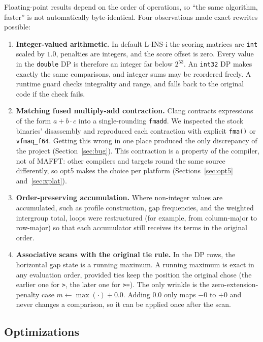 \documentclass[11pt]{article}
\newcommand{\code}[1]{\texttt{#1}}
\begin{document}
Floating-point results depend on the order of operations, so ``the same algorithm, faster''
is not automatically byte-identical. Four observations made exact rewrites possible:

\begin{enumerate}
\item \textbf{Integer-valued arithmetic.} In default L-INS-i the scoring matrices are
  \code{int} scaled by $1.0$, penalties are integers, and the score offset is zero. Every
  value in the \code{double} DP is therefore an integer far below $2^{53}$. An \code{int32}
  DP makes exactly the same comparisons, and integer sums may be reordered freely. A
  runtime guard checks integrality and range, and falls back to the original code if the
  check fails.
\item \textbf{Matching fused multiply-add contraction.} Clang contracts expressions of the
  form $a + b\cdot c$ into a single-rounding \code{fmadd}. We inspected the stock binaries'
  disassembly and reproduced each contraction with explicit \code{fma()} or
  \code{vfmaq\_f64}. Getting this wrong in one place produced the only discrepancy of the
  project (Section~\ref{sec:bug}). This contraction is a property of the compiler, not of
  MAFFT: other compilers and targets round the same source differently, so opt5 makes the
  choice per platform (Sections~\ref{sec:opt5} and~\ref{sec:xplat}).
\item \textbf{Order-preserving accumulation.} Where non-integer values are accumulated,
  such as profile construction, gap frequencies, and the weighted intergroup total, loops
  were restructured (for example, from column-major to row-major) so that each accumulator
  still receives its terms in the original order.
\item \textbf{Associative scans with the original tie rule.} In the DP rows, the horizontal
  gap state is a running maximum. A running maximum is exact in any evaluation order,
  provided ties keep the position the original chose (the earlier one for \code{>}, the
  later one for \code{>=}). The only wrinkle is the zero-extension-penalty case
  $m \leftarrow \max(\cdot) + 0.0$. Adding $0.0$ only maps $-0$ to $+0$ and never changes
  a comparison, so it can be applied once after the scan.
\end{enumerate}

\subsection{Optimizations}
\end{document}
